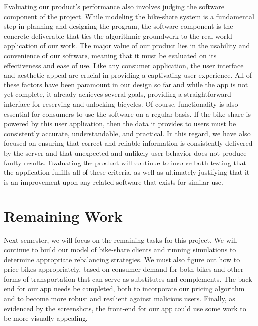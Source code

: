 \documentclass{sig-alternate}
\begin{document}
        	Evaluating our product's performance also involves judging the software component of the project. While modeling the bike-share system is a fundamental step in planning and designing the program, the software component is the concrete deliverable that ties the algorithmic groundwork to the real-world application of our work. The major value of our product lies in the usability and convenience of our software, meaning that it must be evaluated on its effectiveness and ease of use. Like any consumer application, the user interface and aesthetic appeal are crucial in providing a captivating user experience. All of these factors have been paramount in our design so far and while the app is not yet complete, it already achieves several goals, providing a straightforward interface for reserving and unlocking bicycles. Of course, functionality is also essential for consumers to use the software on a regular basis. If the bike-share is powered by this user application, then the data it provides to users must be consistently accurate, understandable, and practical. In this regard, we have also focused on ensuring that correct and reliable information is consistently delivered by the server and that unexpected and unlikely user behavior does not produce faulty results. Evaluating the product will continue to involve both testing that the application fulfills all of these criteria, as well as ultimately justifying that it is an improvement upon any related software that exists for similar use.
\section{Remaining Work}
Next semester, we will focus on the remaining tasks for this project.  We will continue to build our model of bike-share clients and running simulations to determine appropriate rebalancing strategies.  We must also figure out how to price bikes appropriately, based on consumer demand for both bikes and other forms of transportation that can serve as substitutes and complements.  The back-end for our app needs be completed, both to incorporate our pricing algorithm and to become more robust and resilient against malicious users.  Finally, as evidenced by the screenshots, the front-end for our app could use some work to be more visually appealing. \newline
\end{document}
